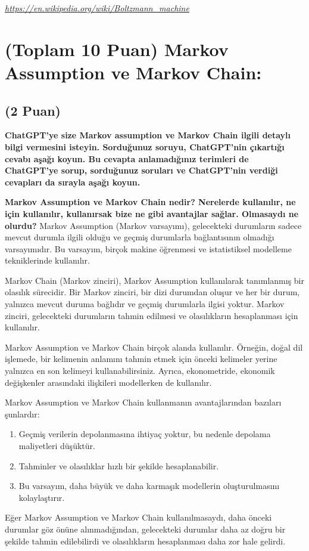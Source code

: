 \documentclass[11pt]{article}
\begin{document}
\textit{\url{https://en.wikipedia.org/wiki/Boltzmann_machine}
}


\section{(Toplam 10 Puan) Markov Assumption ve Markov Chain:}

\subsection{(2 Puan)} \textbf{ChatGPT’ye size Markov assumption ve Markov Chain ilgili detaylı bilgi vermesini isteyin. Sorduğunuz soruyu, ChatGPT'nin çıkartığı cevabı aşağı koyun. Bu cevapta anlamadığınız terimleri de ChatGPT’ye sorup, sorduğunuz soruları ve ChatGPT’nin verdiği cevapları da sırayla aşağı koyun.}

\textbf{Markov Assumption ve Markov Chain nedir? Nerelerde kullanılır, ne için kullanılır, kullanırsak bize ne gibi avantajlar sağlar. Olmasaydı ne olurdu?}
Markov Assumption (Markov varsayımı), gelecekteki durumların sadece mevcut durumla ilgili olduğu ve geçmiş durumlarla bağlantısının olmadığı varsayımıdır. Bu varsayım, birçok makine öğrenmesi ve istatistiksel modelleme tekniklerinde kullanılır.

Markov Chain (Markov zinciri), Markov Assumption kullanılarak tanımlanmış bir olasılık sürecidir. Bir Markov zinciri, bir dizi durumdan oluşur ve her bir durum, yalnızca mevcut duruma bağlıdır ve geçmiş durumlarla ilgisi yoktur. Markov zinciri, gelecekteki durumların tahmin edilmesi ve olasılıkların hesaplanması için kullanılır.

Markov Assumption ve Markov Chain birçok alanda kullanılır. Örneğin, doğal dil işlemede, bir kelimenin anlamını tahmin etmek için önceki kelimeler yerine yalnızca en son kelimeyi kullanabilirsiniz. Ayrıca, ekonometride, ekonomik değişkenler arasındaki ilişkileri modellerken de kullanılır.

Markov Assumption ve Markov Chain kullanmanın avantajlarından bazıları şunlardır:
\begin{enumerate}
    \item Geçmiş verilerin depolanmasına ihtiyaç yoktur, bu nedenle depolama maliyetleri düşüktür.
    \item Tahminler ve olasılıklar hızlı bir şekilde hesaplanabilir.

\item Bu varsayım, daha büyük ve daha karmaşık modellerin oluşturulmasını kolaylaştırır.

\end{enumerate}
 Eğer Markov Assumption ve Markov Chain kullanılmasaydı, daha önceki durumlar göz önüne alınmadığından, gelecekteki durumlar daha az doğru bir şekilde tahmin edilebilirdi ve olasılıkların hesaplanması daha zor hale gelirdi.
\end{document}
